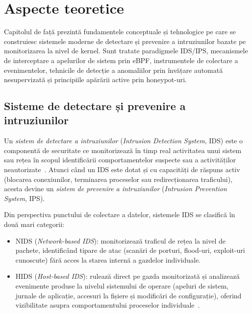 
\chapter{Aspecte teoretice}

Capitolul de față prezintă fundamentele conceptuale și tehnologice pe care se construiesc
sistemele moderne de detectare și prevenire a intruziunilor bazate pe monitorizarea la nivel
de kernel. Sunt tratate paradigmele IDS/IPS, mecanismele de interceptare a apelurilor de sistem
prin eBPF, instrumentele de colectare a evenimentelor, tehnicile de detecție a anomaliilor prin
învățare automată nesupervizată și principiile apărării active prin honeypot-uri.

\section{Sisteme de detectare și prevenire a intruziunilor}

Un \textit{sistem de detectare a intruziunilor} (\textit{Intrusion Detection System}, IDS) este
o componentă de securitate ce monitorizează în timp real activitatea unui sistem sau rețea în scopul
identificării comportamentelor suspecte sau a activităților neautorizate~\cite{liu2018hids}. Atunci
când un IDS este dotat și cu capacități de răspuns activ (blocarea conexiunilor, terminarea
proceselor sau redirecționarea traficului), acesta devine un \textit{sistem de prevenire a
intruziunilor} (\textit{Intrusion Prevention System}, IPS).

Din perspectiva punctului de colectare a datelor, sistemele IDS se clasifică în două mari categorii:

\begin{itemize}
  \item NIDS (\textit{Network-based IDS}): monitorizează traficul de rețea la nivel de
    pachete, identificând tipare de atac (scanări de porturi, flood-uri, exploit-uri cunoscute)
    fără acces la starea internă a gazdelor individuale.
  \item HIDS (\textit{Host-based IDS}): rulează direct pe gazda monitorizată și analizează
    evenimente produse la nivelul sistemului de operare (apeluri de sistem, jurnale de aplicație,
    accesuri la fișiere și modificări de configurație), oferind vizibilitate asupra comportamentului
    proceselor individuale~\cite{liu2018hids}.
\end{itemize}

